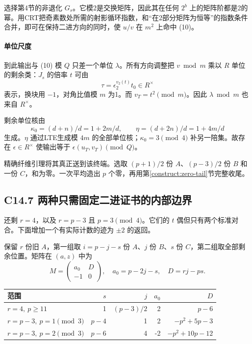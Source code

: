 {选择第4节的非退化} \(G_s\){。它模2是交换矩阵，因此其在任何} \(2^b\) {上的矩阵阶都是2的幂。用CRT把奇素数处所需的射影循环指数，和``在2部分矩阵为恒等''的指数条件合并，即可在保持二进方向的同时，使} \(u/v\) {在} \(m^2\) {上命中} {(10)。}

\paragraph*{\texorpdfstring{{单位尺度}}{单位尺度}}\label{C14-h101}

{到此输出与} {(10)} {模} \(Q\) {只差一个单位} \(\lambda\){。所有方向调整把} \(v\bmod m\) {乘以} \(R\) {单位的剩余类：}\(J_s\) {的倍率} \(t\) {可由} \[
\tau=\epsilon_2^{v_2(t)}t_0\in R^\times
\] {表示，换块用} \(-1\){，对角比值模} \(m\) {为1。而} \(v_T=t^2\pmod m\){。因此} \(\lambda\bmod m\) {也来自} \(R^\times\){。}

{剩余单位核由} \[
\kappa_0=(d+n)/d=1+2m/d,\qquad
\eta=(d+2n)/d=1+4m/d
\] {生成。}\(\eta\) {通过LTE生成模} \(4m\) {的全部单位核；}\(\kappa_0=3\pmod4\) {补另一陪集。故存在} \(\epsilon\in R^\times\) {使输出等于} \(\epsilon(u_T,v_T)\pmod Q\){。}

{精确纤维引理将其真正送到该终端。选取} \((p+1)/2\) {份} \(A\){、}\((p-3)/2\) {份} \(B\) {和一份} \(C\){，和为零。一次平均造出} \(p\) {个零，再用}第\ref{construct:zero-tail}节{完整收尾。}

\subsection*{\texorpdfstring{{C14.7} {两种只需固定二进证书的内部边界}}{C14.7 两种只需固定二进证书的内部边界}}\label{C14-h102}

{还剩} \(r=4\){，以及} \(r=p-3\) {且} \(p=3\pmod4\){。它们的} \(t\) {偶但只有两个标准对合。下面增加一个有实际计数的迹为} \(\pm2\) {的返回。}

{保留} \(r\) {份旧} \(A\){，第一组取} \(i=p-j-s\) {份} \(A\){、}\(j\) {份} \(B\){、}\(s\) {份} \(C\){，第二组取全部剩余位置。矩阵在} \((a,z)\) {中为} \[
M=\begin{pmatrix}a_0&D\\-1&0\end{pmatrix},\quad
a_0=p-2j-s,\quad D=rj-ps.
\tag{C14.11}
\]

{ %
\begin{longtable}[]{@{}lrrrr@{}}
\toprule\noalign{}
{范围} & \(s\) & \(j\) & \(a_0\) & \(D\) \\
\midrule\noalign{}
\endhead
\bottomrule\noalign{}
\endlastfoot
\(r=4,\ p\ge11\) & {1} & \((p-3)/2\) & {2} & \(p-6\) \\
\(r=p-3,\ p=1\pmod3\) & \(p-4\) & {1} & {2} & \(-p^2+5p-3\) \\
\(r=p-3,\ p=2\pmod3\) & \(p-6\) & {4} & {-2} & \(-p^2+10p-12\) \\
\end{longtable}
}

